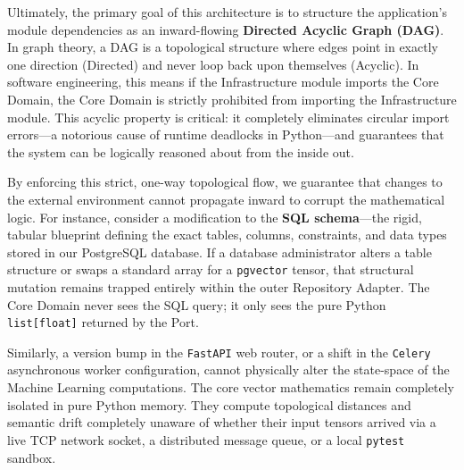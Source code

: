 
Ultimately, the primary goal of this architecture is to structure the application's module dependencies as an inward-flowing \textbf{Directed Acyclic Graph (DAG)}. In graph theory, a DAG is a topological structure where edges point in exactly one direction (Directed) and never loop back upon themselves (Acyclic). In software engineering, this means if the Infrastructure module imports the Core Domain, the Core Domain is strictly prohibited from importing the Infrastructure module. This acyclic property is critical: it completely eliminates circular import errors---a notorious cause of runtime deadlocks in Python---and guarantees that the system can be logically reasoned about from the inside out.

By enforcing this strict, one-way topological flow, we guarantee that changes to the external environment cannot propagate inward to corrupt the mathematical logic. For instance, consider a modification to the \textbf{SQL schema}---the rigid, tabular blueprint defining the exact tables, columns, constraints, and data types stored in our PostgreSQL database. If a database administrator alters a table structure or swaps a standard array for a \texttt{pgvector} tensor, that structural mutation remains trapped entirely within the outer Repository Adapter. The Core Domain never sees the SQL query; it only sees the pure Python \texttt{list[float]} returned by the Port.

Similarly, a version bump in the \texttt{FastAPI} web router, or a shift in the \texttt{Celery} asynchronous worker configuration, cannot physically alter the state-space of the Machine Learning computations. The core vector mathematics remain completely isolated in pure Python memory. They compute topological distances and semantic drift completely unaware of whether their input tensors arrived via a live TCP network socket, a distributed message queue, or a local \texttt{pytest} sandbox.
